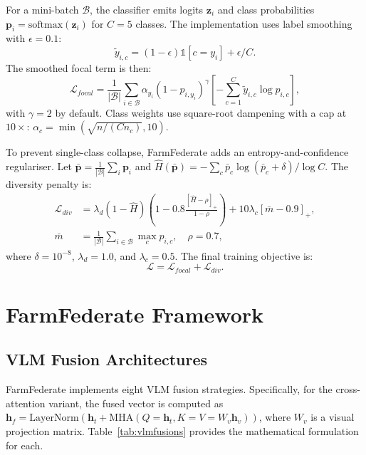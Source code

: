 \documentclass[12pt, a4paper, oneside]{Thesis}
\begin{document}
For a mini-batch $\mathcal{B}$, the classifier emits logits $\mathbf{z}_i$ and
class probabilities $\mathbf{p}_i=\mathrm{softmax}(\mathbf{z}_i)$ for $C=5$
classes. The implementation uses label smoothing with $\epsilon=0.1$:
\begin{equation}
  \tilde{y}_{i,c}=(1-\epsilon)\mathbb{1}[c=y_i]+\epsilon/C .
  \label{eq:smooth}
\end{equation}
The smoothed focal term is then:
\begin{equation}
  \mathcal{L}_{focal}
  = \frac{1}{|\mathcal{B}|}\sum_{i\in\mathcal{B}}
    \alpha_{y_i}(1-p_{i,y_i})^\gamma
    \left[-\sum_{c=1}^{C}\tilde{y}_{i,c}\log p_{i,c}\right],
  \label{eq:focal}
\end{equation}
with $\gamma=2$ by default. Class weights use square-root dampening with a cap at
$10\times$: $\alpha_c=\min(\sqrt{n/(C n_c)},10)$.

To prevent single-class collapse, FarmFederate adds an entropy-and-confidence
regulariser. Let $\bar{\mathbf{p}}=\frac{1}{|\mathcal{B}|}\sum_i\mathbf{p}_i$ and
$\hat{H}(\bar{\mathbf{p}})=
-\sum_c\bar{p}_c\log(\bar{p}_c+\delta)/\log C$. The diversity penalty is:
\begin{align}
  \mathcal{L}_{div}
  &= \lambda_d(1-\hat{H})
     \left(1-0.8\frac{[\hat{H}-\rho]_+}{1-\rho}\right)
     +10\lambda_c[\bar{m}-0.9]_+, \label{eq:div}\\
  \bar{m} &= \frac{1}{|\mathcal{B}|}\sum_{i\in\mathcal{B}}\max_c p_{i,c},
  \quad \rho=0.7,
\end{align}
where $\delta=10^{-8}$, $\lambda_d=1.0$, and $\lambda_c=0.5$. The final training
objective is:
\begin{equation}
  \mathcal{L} = \mathcal{L}_{focal}+\mathcal{L}_{div}.
  \label{eq:loss}
\end{equation}

\chapter{FarmFederate Framework}
\label{sec:ff}

\section{VLM Fusion Architectures}

FarmFederate implements eight VLM fusion strategies. Specifically, for the cross-attention variant, the fused vector is computed as $\mathbf{h}_f = \text{LayerNorm}(\mathbf{h}_t + \text{MHA}(Q{=}\mathbf{h}_t, K{=}V{=}W_v\mathbf{h}_v))$, where $W_v$ is a visual projection matrix. Table~\ref{tab:vlmfusions}
provides the mathematical formulation for each.
\end{document}
